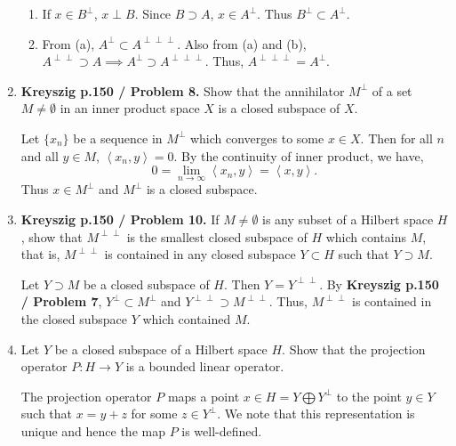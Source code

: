 \documentclass[12pt]{article}
\newcommand{\inn}[2]{\left\langle #1, #2 \right\rangle}
\begin{document}
\begin{enumerate}
\begin{mybox}
\begin{enumerate}
        \item  If $x\in B^\perp$, $x\perp B$. Since
        $B\supset A$, $x\in A^\perp$. Thus $B^\perp
        \subset A^\perp$. 

        \item  From (a), $A^\perp\subset A^{\perp\perp
        \perp}$. Also from (a) and (b), $A^{\perp\perp}
        \supset A\implies A^{\perp}\supset
        A^{\perp\perp\perp}$. Thus,
        $A^{\perp\perp\perp}=A^{\perp}$.
    \end{enumerate}
\end{mybox}


\item \textbf{Kreyszig p.150 / Problem 8.}
Show that the annihilator $M^{\perp}$ of a set
$M\neq\emptyset$ in an inner product space $X$ is a closed
subspace of $X$.
\begin{mybox}

    Let $\{x_n\}$ be a sequence in $M^\perp$ which
    converges to some $x\in X$. Then for
    all $n$ and all $y\in M$, $\inn{x_n}{y}=0$. By the
    continuity of inner product, we have,
    $$0=\lim_{n\to\infty}{\inn{x_n}{y}}=\inn{x}{y}.$$
    Thus $x\in M^\perp$ and $M^\perp$ is a closed subspace.
\end{mybox}

 
\item \textbf{Kreyszig p.150 / Problem 10.}
If $M\neq\emptyset$ is any subset of a Hilbert space $H$,
show that $M^{\perp\perp}$ is the smallest
closed subspace
of $H$ which contains $M$, that is, $M^{\perp\perp}$
is contained in any closed subspace $Y\subset H$ such
that $Y\supset M$.
\begin{mybox}

    Let $Y\supset M$ be a closed subspace of $H$. Then
    $Y=Y^{\perp\perp}$. By
    \textbf{Kreyszig p.150 / Problem 7}, $Y^\perp
    \subset M^\perp$ and $Y^{\perp\perp}\supset
    M^{\perp\perp}$. Thus, $M^{\perp\perp}$ is contained
    in the closed subspace $Y$ which contained $M$.
\end{mybox}
 
\item Let $Y$ be a closed subspace of a Hilbert space
$H$. Show that the projection operator $P: H \to Y$
is a bounded linear operator.
\begin{mybox}

    The projection operator $P$ maps a point $x\in H
    =Y\bigoplus Y^\perp$
    to the point $y\in Y$ such that $x=y+z$ for some
    $z\in Y^\perp$. We note that this representation is
    unique and hence the map $P$ is well-defined.


\end{mybox}
\end{enumerate}
\end{document}
